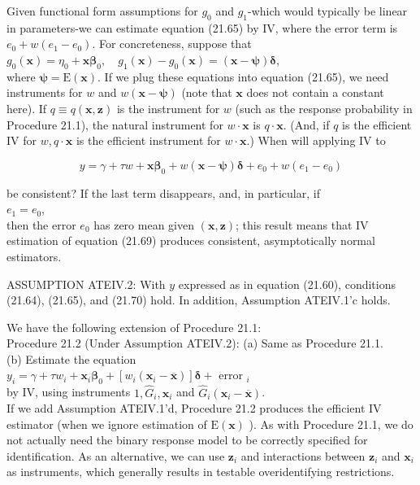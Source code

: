 \documentclass[10pt]{article}
\begin{document}
Given functional form assumptions for $g_{0}$ and $g_{1}$-which would typically be linear in parameters-we can estimate equation (21.65) by IV, where the error term is $e_{0}+w\left(e_{1}-e_{0}\right)$. For concreteness, suppose that\\
$g_{0}(\mathbf{x})=\eta_{0}+\mathbf{x} \boldsymbol{\beta}_{0}, \quad g_{1}(\mathbf{x})-g_{0}(\mathbf{x})=(\mathbf{x}-\boldsymbol{\psi}) \boldsymbol{\delta}$,\\
where $\boldsymbol{\psi}=\mathrm{E}(\mathbf{x})$. If we plug these equations into equation (21.65), we need instruments for $w$ and $w(\mathbf{x}-\boldsymbol{\psi})$ (note that $\mathbf{x}$ does not contain a constant here). If $q \equiv q(\mathbf{x}, \mathbf{z})$ is the instrument for $w$ (such as the response probability in Procedure 21.1), the natural instrument for $w \cdot \mathbf{x}$ is $q \cdot \mathbf{x}$. (And, if $q$ is the efficient IV for $w, q \cdot \mathbf{x}$ is the efficient instrument for $w \cdot \mathbf{x}$.) When will applying IV to


\begin{equation*}
y=\gamma+\tau w+\mathbf{x} \boldsymbol{\beta}_{0}+w(\mathbf{x}-\boldsymbol{\psi}) \boldsymbol{\delta}+e_{0}+w\left(e_{1}-e_{0}\right) \tag{21.69}
\end{equation*}


be consistent? If the last term disappears, and, in particular, if\\
$e_{1}=e_{0}$,\\
then the error $e_{0}$ has zero mean given $(\mathbf{x}, \mathbf{z})$; this result means that IV estimation of equation (21.69) produces consistent, asymptotically normal estimators.

ASSUMPTION ATEIV.2: With $y$ expressed as in equation (21.60), conditions (21.64), (21.65), and (21.70) hold. In addition, Assumption ATEIV.1'c holds.

We have the following extension of Procedure 21.1:\\
Procedure 21.2 (Under Assumption ATEIV.2): (a) Same as Procedure 21.1.\\
(b) Estimate the equation\\
$y_{i}=\gamma+\tau w_{i}+\mathbf{x}_{i} \boldsymbol{\beta}_{0}+\left[w_{i}\left(\mathbf{x}_{i}-\overline{\mathbf{x}}\right)\right] \boldsymbol{\delta}+$ error $_{i}$\\
by IV, using instruments $1, \hat{G}_{i}, \mathbf{x}_{i}$ and $\hat{G}_{i}\left(\mathbf{x}_{i}-\overline{\mathbf{x}}\right)$.\\
If we add Assumption ATEIV.1'd, Procedure 21.2 produces the efficient IV estimator (when we ignore estimation of $\mathrm{E}(\mathbf{x})$ ). As with Procedure 21.1, we do not actually need the binary response model to be correctly specified for identification. As an alternative, we can use $\mathbf{z}_{i}$ and interactions between $\mathbf{z}_{i}$ and $\mathbf{x}_{i}$ as instruments, which generally results in testable overidentifying restrictions.
\end{document}
